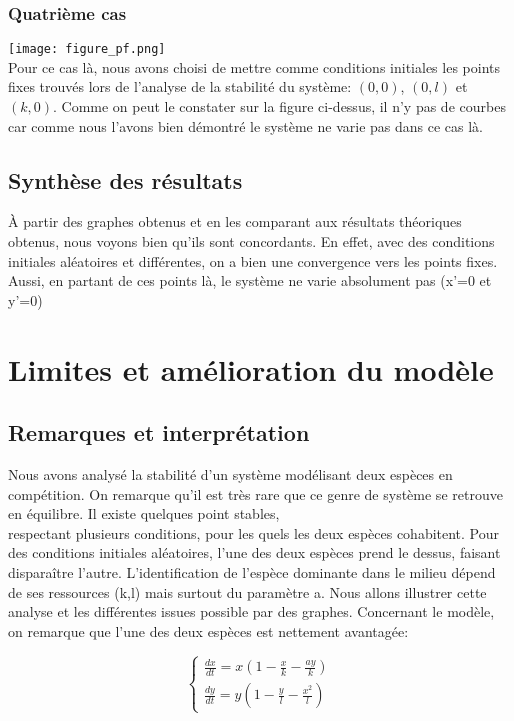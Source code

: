 \documentclass{article}
\begin{document}
\subsubsection{Quatrième cas}
\texttt{[image: figure\_pf.png]}\\
Pour ce cas là, nous avons choisi de mettre comme conditions initiales les points fixes trouvés lors de l'analyse de la stabilité du système: $(0,0)$, $(0,l)$ et $(k,0)$. Comme on peut le constater sur la figure ci-dessus, il n'y pas de courbes car comme nous l'avons bien démontré le système ne varie pas dans ce cas là.

\setcounter{secnumdepth}{1}
\subsection{Synthèse des résultats}
À partir des graphes obtenus et en les comparant aux résultats théoriques obtenus, nous voyons bien qu'ils sont concordants. En effet, avec des conditions initiales aléatoires et différentes, on a bien une convergence vers les points fixes. Aussi, en partant de ces points là, le système ne varie absolument pas (x'=0 et y'=0)\\

\section{Limites et amélioration du modèle}
\subsection{Remarques et interprétation}
Nous avons analysé la stabilité d'un système modélisant deux espèces en compétition. On remarque qu'il est très rare que ce genre de système se retrouve en équilibre. Il existe quelques point stables,\\respectant plusieurs conditions, pour les quels les deux espèces cohabitent. Pour des conditions initiales aléatoires, l'une des deux espèces prend le dessus, faisant disparaître l'autre. L'identification de l'espèce dominante dans le milieu dépend de ses ressources (k,l) mais surtout du paramètre a. Nous allons illustrer cette analyse et les différentes issues possible par des graphes. Concernant le modèle, on remarque que l'une des deux espèces est nettement avantagée: 

\begin{equation*}
\tag{S}
\left\{
\begin{array}{ll}
    \frac{dx}{dt} =  x(1 - \frac{x}{k} - \frac{a y}{k}) \\
    \frac{dy}{dt} = y(1- \frac{y}{l} - \frac{x^{2}}{l})
\end{array}
\right.
\end{equation*}\\
\end{document}
